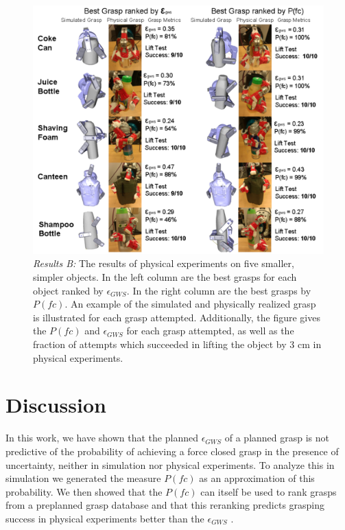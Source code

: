 \begin{figure}
\centering
\includegraphics[width=\linewidth]{pfc_physical_grasps_small.png}
\caption{\emph{Results B:} The results of physical experiments on five smaller, simpler objects. In the left column are the best grasps for each object ranked by $\epsilon_{GWS}$. In the right column are the best grasps by $P(fc)$. An example of the simulated and physically realized grasp is illustrated for each grasp attempted. Additionally, the figure gives the $P(fc)$ and $\epsilon_{GWS}$ for each grasp attempted, as well as the fraction of attempts which succeeded in lifting the object by 3 cm in physical experiments.}
\label{fig:fgrasps_small}
\end{figure}
 

\section{Discussion}
\label{discussion}
In this work, we have shown that the planned $\epsilon_{GWS}$ of a planned grasp is not predictive of the probability of achieving a force closed grasp in the presence of uncertainty, neither in simulation nor physical experiments. To analyze this in simulation we generated the measure $P(fc)$ as an approximation of this probability. We then showed that the $P(fc)$ can itself be used to rank grasps from a preplanned grasp database and that this reranking predicts grasping success in physical
experiments better than the $\epsilon_{GWS}$ . 

